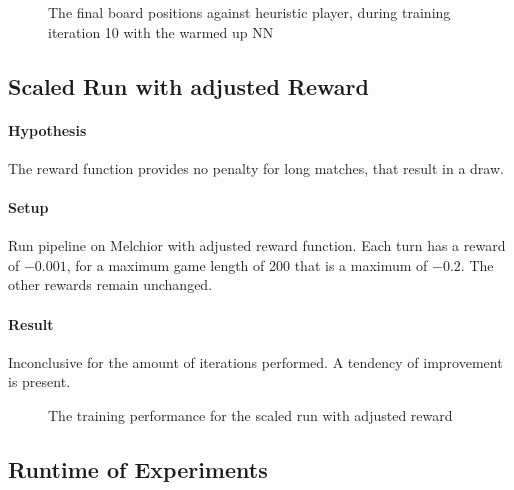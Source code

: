 \begin{figure}[!h]
    \centering
    \caption{The final board positions against heuristic player, during training iteration 10 with the warmed up NN}
    \label{performance_remote_warmed_up_heuristic}
\end{figure}

\subsection{Scaled Run with adjusted Reward}
\paragraph{Hypothesis} The reward function provides no penalty for long matches, that result in a draw.
\paragraph{Setup} Run pipeline on Melchior with adjusted reward function. Each turn has a reward of $-0.001$, for a maximum game length of 200 that is a maximum of $-0.2$. The other rewards remain unchanged.

\paragraph{Result} Inconclusive for the amount of iterations performed. A tendency of improvement is present.
\begin{figure}[!h]
    \centering
    \hfill
    \caption{The training performance for the scaled run with adjusted reward}
    \label{performance_remote_diff_z}
\end{figure}

\subsection{Runtime of Experiments}
